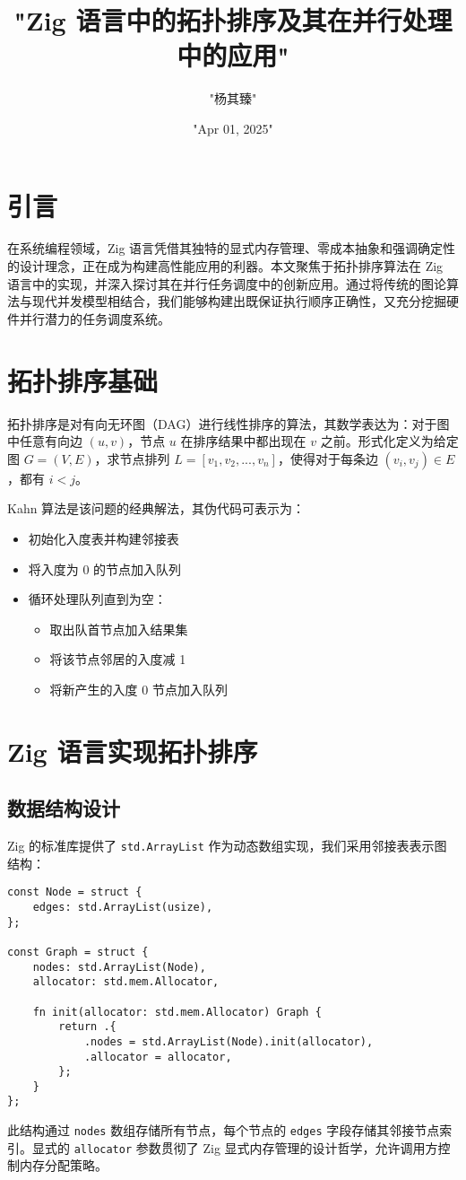 \title{"Zig 语言中的拓扑排序及其在并行处理中的应用"}
\author{"杨其臻"}
\date{"Apr 01, 2025"}
\maketitle
\chapter{引言}
在系统编程领域，Zig 语言凭借其独特的显式内存管理、零成本抽象和强调确定性的设计理念，正在成为构建高性能应用的利器。本文聚焦于拓扑排序算法在 Zig 语言中的实现，并深入探讨其在并行任务调度中的创新应用。通过将传统的图论算法与现代并发模型相结合，我们能够构建出既保证执行顺序正确性，又充分挖掘硬件并行潜力的任务调度系统。\par
\chapter{拓扑排序基础}
拓扑排序是对有向无环图（DAG）进行线性排序的算法，其数学表达为：对于图中任意有向边 $(u, v)$，节点 $u$ 在排序结果中都出现在 $v$ 之前。形式化定义为给定图 $G=(V, E)$，求节点排列 $L = [v_1, v_2, ..., v_n]$，使得对于每条边 $(v_i, v_j) \in E$，都有 $i < j$。\par
Kahn 算法是该问题的经典解法，其伪代码可表示为：\par
\begin{itemize}
\item 初始化入度表并构建邻接表
\item 将入度为 0 的节点加入队列
\item 循环处理队列直到为空：\begin{itemize}
\item 取出队首节点加入结果集
\item 将该节点邻居的入度减 1
\item 将新产生的入度 0 节点加入队列
\end{itemize}

\end{itemize}
\chapter{Zig 语言实现拓扑排序}
\section{数据结构设计}
Zig 的标准库提供了 \verb!std.ArrayList! 作为动态数组实现，我们采用邻接表表示图结构：\par
\begin{lstlisting}[language=zig]
const Node = struct {
    edges: std.ArrayList(usize),
};

const Graph = struct {
    nodes: std.ArrayList(Node),
    allocator: std.mem.Allocator,

    fn init(allocator: std.mem.Allocator) Graph {
        return .{
            .nodes = std.ArrayList(Node).init(allocator),
            .allocator = allocator,
        };
    }
};
\end{lstlisting}
此结构通过 \verb!nodes! 数组存储所有节点，每个节点的 \verb!edges! 字段存储其邻接节点索引。显式的 \verb!allocator! 参数贯彻了 Zig 显式内存管理的设计哲学，允许调用方控制内存分配策略。\par
